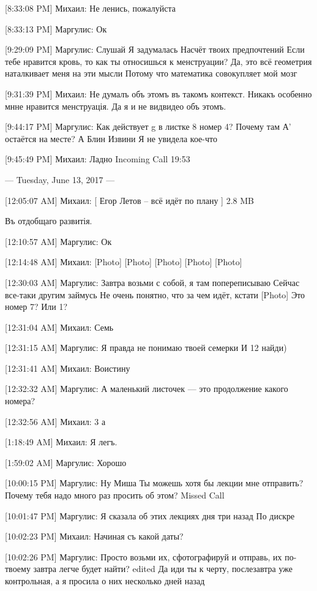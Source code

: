 \documentclass{article}
\newcommand{\yat}{{\fontencoding{X2}\selectfont\cyryat}} %
\begin{document}
[8:33:08 PM] Михаил:
Не ленись, пожалуйста

[8:33:13 PM] Маргулис:
Ок

[9:29:09 PM] Маргулис:
Слушай
 Я задумалась
 Насчёт твоих предпочтений
 Если тебе нравится кровь, то как ты относишься к менструации?
 Да, это всё геометрия наталкивает меня на эти мысли
 Потому что математика совокупляет мой мозг

[9:31:39 PM] Михаил:
Не думалъ объ этомъ въ такомъ контекст\yat. Никакъ особенно мн\yat не нравится менструація. Да я и не вид видео объ этомъ.

[9:44:17 PM] Маргулис:
Как действует g в листке 8 номер 4? Почему там А' остаётся на месте?
 А
 Блин
 Извини
 Я не увидела кое-что

[9:45:49 PM] Михаил:
Ладно
Incoming Call 19:53

--- Tuesday, June 13, 2017 ---

[12:05:07 AM] Михаил:
[ Егор Летов – всё идёт по плану  ] 2.8 MB
 
 Въ отд общаго развитія.

[12:10:57 AM] Маргулис:
Ок

[12:14:48 AM] Михаил:
[Photo]
 [Photo]
 [Photo]
 [Photo]
 [Photo]

[12:30:03 AM] Маргулис:
Завтра возьми с собой, я там попереписываю
 Сейчас все-таки другим займусь
 Не очень понятно, что за чем идёт, кстати
 [Photo]
 Это номер 7?
 Или 1?

[12:31:04 AM] Михаил:
Семь

[12:31:15 AM] Маргулис:
Я правда не понимаю твоей семерки
 И 12 найди)

[12:31:41 AM] Михаил:
Воистину

[12:32:32 AM] Маргулис:
А маленький листочек — это продолжение какого номера?

[12:32:56 AM] Михаил:
3 а

[1:18:49 AM] Михаил:
Я легъ.

[1:59:02 AM] Маргулис:
Хорошо

[10:00:15 PM] Маргулис:
Ну Миша
 Ты можешь хотя бы лекции мне отправить?
 Почему тебя надо много раз просить об этом?
Missed Call

[10:01:47 PM] Маргулис:
Я сказала об этих лекциях дня три назад
 По дискре

[10:02:23 PM] Михаил:
Начиная съ какой даты?

[10:02:26 PM] Маргулис:
Просто возьми их, сфотографируй и отправь, их по-твоему завтра легче будет найти?
edited 
Да иди ты к черту, послезавтра уже контрольная, а я просила о них несколько дней назад
\end{document}

